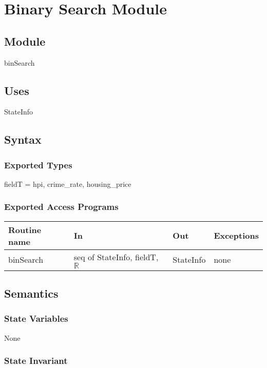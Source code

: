 \documentclass[12pt]{article}
\begin{document}
\newpage

\section* {Binary Search Module}

\subsection* {Module}

binSearch

\subsection* {Uses}

StateInfo

\subsection* {Syntax}

\subsubsection* {Exported Types}

fieldT = {hpi, crime\_rate, housing\_price}

\subsubsection* {Exported Access Programs}

\begin{tabular}{| l | l | l | p{5cm} |}
\hline
\textbf{Routine name} & \textbf{In} & \textbf{Out} & \textbf{Exceptions}\\
\hline
binSearch &  seq of StateInfo, fieldT, $\mathbb{R}$ &  StateInfo & none\\
\hline
\end{tabular}

\subsection* {Semantics}

\subsubsection* {State Variables}

None

\subsubsection* {State Invariant}
\end{document}
